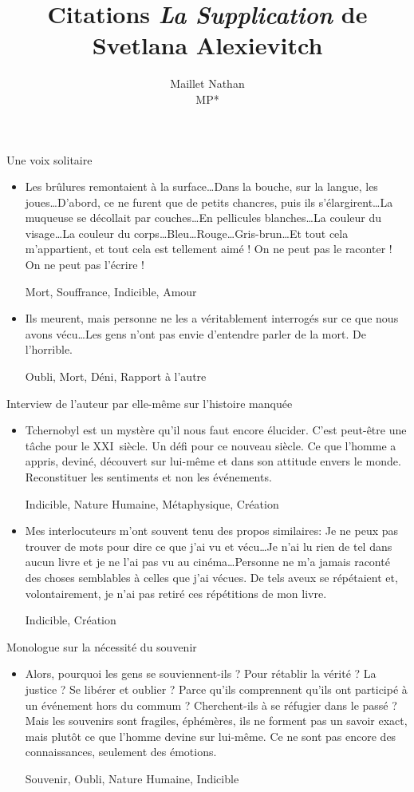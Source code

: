 \documentclass[french,a4paper,11pt,answers]{exam}
\title{Citations \emph{La Supplication} de Svetlana Alexievitch}
\author{Maillet Nathan\\MP*}
\date{}
\newcommand{\cit}[2]{\og #1 \fg{} \begin{solution}{ #2 }\end{solution}} %
\begin{document}
    \maketitle

    \begin{cadre}{Une voix solitaire}
	\begin{itemize}
	    \item \cit {Les brûlures remontaient à la surface\ldots Dans la bouche, sur la langue, les joues\ldots D'abord, ce ne furent que de petits chancres, puis ils s'élargirent\ldots La muqueuse se décollait par couches\ldots En pellicules blanches\ldots La couleur du visage\ldots La couleur du corps\ldots Bleu\ldots Rouge\ldots Gris-brun\ldots Et tout cela m'appartient, et tout cela est tellement aimé ! On ne peut pas le raconter ! On ne peut pas l'écrire !} %
		{Mort, Souffrance, Indicible, Amour} %
	    \item \cit {Ils meurent, mais personne ne les a véritablement interrogés sur ce que nous avons vécu\ldots Les gens n'ont pas envie d'entendre parler de la mort. De l'horrible.}
		{Oubli, Mort, Déni, Rapport à l'autre}
	\end{itemize}
    \end{cadre}

    \begin{cadre}{Interview de l'auteur par elle-même sur l'histoire manquée}
	\begin{itemize}
	    \item \cit {Tchernobyl est un mystère qu'il nous faut encore élucider. C'est peut-être une tâche pour le \textsc{XXI}\ieme~siècle. Un défi pour ce nouveau siècle. Ce que l'homme a appris, deviné, découvert sur lui-même et dans son attitude envers le monde. Reconstituer les sentiments et non les événements.}
		{Indicible, Nature Humaine, Métaphysique, Création}
	    \item \cit{Mes interlocuteurs m'ont souvent tenu des propos similaires: \og Je ne peux pas trouver de mots pour dire ce que j'ai vu et vécu\ldots Je n'ai lu rien de tel dans aucun livre et je ne l'ai pas vu au cinéma\ldots Personne ne m'a jamais raconté des choses semblables à celles que j'ai vécues. \fg{} De tels aveux se répétaient et, volontairement, je n'ai pas retiré ces répétitions de mon livre.}
		{Indicible, Création}
	\end{itemize}
    \end{cadre}

    \begin{cadre}{Monologue sur la nécessité du souvenir}
	\begin{itemize}
	    \item \cit {Alors, pourquoi les gens se souviennent-ils ? Pour rétablir la vérité ? La justice ? Se libérer et oublier ? Parce qu'ils comprennent qu'ils ont participé à un événement hors du commum ? Cherchent-ils à se réfugier dans le passé ? Mais les souvenirs sont fragiles, éphémères, ils ne forment pas un savoir exact, mais plutôt ce que l'homme devine sur lui-même. Ce ne sont pas encore des connaissances, seulement des émotions.}
		{Souvenir, Oubli, Nature Humaine, Indicible}
	\end{itemize}
    \end{cadre}
\end{document}
